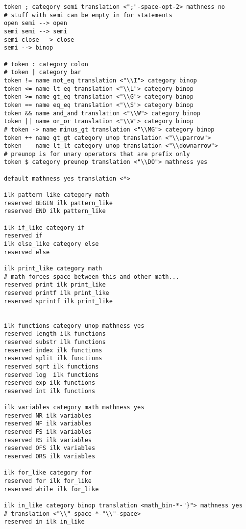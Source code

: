 \begin{verbatim}
token ; category semi translation <";"-space-opt-2> mathness no
# stuff with semi can be empty in for statements
open semi --> open
semi semi --> semi
semi close --> close
semi --> binop

# token : category colon
# token | category bar
token != name not_eq translation <"\\I"> category binop
token <= name lt_eq translation <"\\L"> category binop
token >= name gt_eq translation <"\\G"> category binop
token == name eq_eq translation <"\\S"> category binop
token && name and_and translation <"\\W"> category binop
token || name or_or translation <"\\V"> category binop
# token -> name minus_gt translation <"\\MG"> category binop
token ++ name gt_gt category unop translation <"\\uparrow">
token -- name lt_lt category unop translation <"\\downarrow">
# preunop is for unary operators that are prefix only
token $ category preunop translation <"\\DO"> mathness yes

default mathness yes translation <*>

ilk pattern_like category math
reserved BEGIN ilk pattern_like
reserved END ilk pattern_like

ilk if_like category if
reserved if
ilk else_like category else
reserved else

ilk print_like category math
# math forces space between this and other math...
reserved print ilk print_like
reserved printf ilk print_like
reserved sprintf ilk print_like


ilk functions category unop mathness yes
reserved length ilk functions
reserved substr ilk functions
reserved index ilk functions
reserved split ilk functions
reserved sqrt ilk functions
reserved log  ilk functions
reserved exp ilk functions
reserved int ilk functions

ilk variables category math mathness yes
reserved NR ilk variables
reserved NF ilk variables
reserved FS ilk variables
reserved RS ilk variables
reserved OFS ilk variables
reserved ORS ilk variables

ilk for_like category for
reserved for ilk for_like
reserved while ilk for_like

ilk in_like category binop translation <math_bin-*-"}"> mathness yes
# translation <"\\"-space-*-"\\"-space>
reserved in ilk in_like


\end{verbatim}
